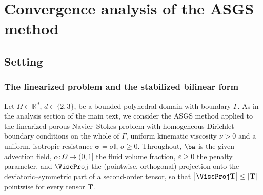 \section{Convergence analysis of the ASGS method}\label{app:Continuity}

\subsection{Setting}\label{sec:setting}

\subsubsection{The linearized problem and the stabilized bilinear form}
Let $\Omega\subset\mathbb{R}^d$, $d\in\{2,3\}$, be a bounded polyhedral domain with
boundary $\Gamma$. As in the analysis section of the main text, we consider the ASGS
method applied to the linearized porous Navier--Stokes problem with homogeneous Dirichlet
boundary conditions on the whole of $\Gamma$, uniform kinematic viscosity $\nu>0$ and a
uniform, isotropic resistance $\boldsymbol{\sigma}=\sigma\mathbb{I}$, $\sigma\ge 0$. Throughout,
$\ba$ is the given advection field, $\alpha:\Omega\to(0,1]$ the fluid volume fraction,
$\varepsilon\ge 0$ the penalty parameter, and $\ViscProj$ the (pointwise, orthogonal)
projection onto the deviatoric--symmetric part of a second-order tensor, so that
$\bigl|\ViscProj\mathbf{T}\bigr|\le|\mathbf{T}|$ pointwise for every tensor $\mathbf{T}$.

